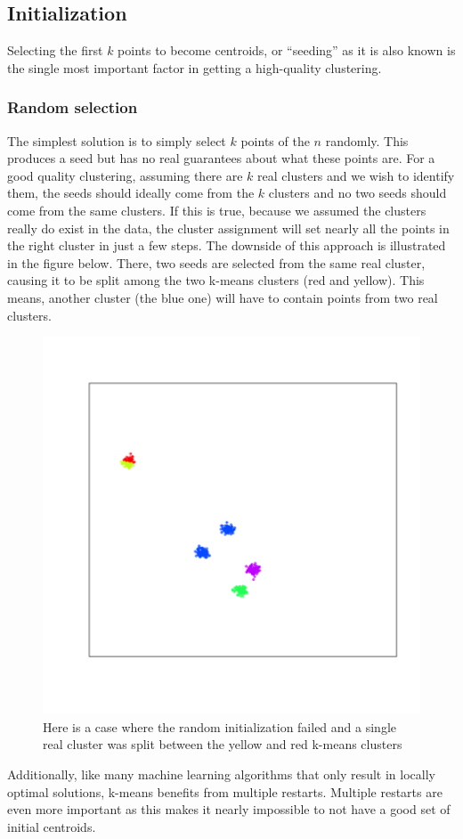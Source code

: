 \documentclass{article}
\begin{document}
\subsection{Initialization}
Selecting the first $k$ points to become centroids, or ``seeding'' as it is
also known is the single most important factor in getting a high-quality
clustering.

\subsubsection{Random selection}
The simplest solution is to simply select $k$ points of the $n$ randomly. This
produces a seed but has no real guarantees about what these points are.
For a good quality clustering, assuming there are $k$ real clusters and we wish
to identify them, the seeds should ideally come from the $k$ clusters and no
two seeds should come from the same clusters.
If this is true, because we assumed the clusters really do exist in the data,
the cluster assignment will set nearly all the points in the right cluster in
just a few steps.
The downside of this approach is illustrated in the figure below. There, two
seeds are selected from the same real cluster, causing it to be split among the
two k-means clusters (red and yellow). This means, another cluster (the blue
one) will have to contain points from two real clusters.
\begin{figure}[H]
    \caption{Here is a case where the random initialization failed and a
    single real cluster was split between the yellow and red k-means clusters}
    \includegraphics[scale=0.7]{kmfail.png}
\end{figure}
Additionally, like many machine learning algorithms that only result in locally
optimal solutions, k-means benefits from multiple restarts. Multiple restarts
are even more important as this makes it nearly impossible to not have a good
set of initial centroids.
\end{document}
